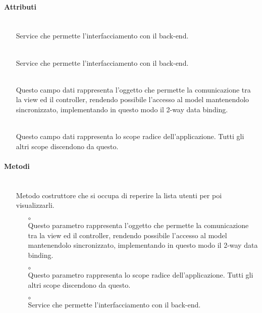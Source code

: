 \paragraph*{Attributi}
\begin{itemize}
\item[]  \\ Service che permette l'interfacciamento con il back-end.
\item[]  \\ Service che permette l'interfacciamento con il back-end.
\item[]  \\ Questo campo dati rappresenta l'oggetto che permette la comunicazione tra la view ed il controller, rendendo possibile l’accesso al model mantenendolo sincronizzato, implementando in questo modo il 2-way data binding.
\item[]  \\ Questo campo dati rappresenta lo scope radice dell'applicazione. Tutti gli altri scope discendono da questo.
\end{itemize}

\paragraph*{Metodi}
\begin{itemize}
\item[]  \\ Metodo costruttore che si occupa di reperire la lista utenti per poi visualizzarli.
\begin{itemize}\addtolength{\itemsep}{-0.5\baselineskip}
\item[$\circ$]  \\ Questo parametro rappresenta l'oggetto che permette la comunicazione tra la view ed il controller, rendendo possibile l’accesso al model mantenendolo sincronizzato, implementando in questo modo il 2-way data binding.
\item[$\circ$]  \\ Questo parametro rappresenta lo scope radice dell'applicazione. Tutti gli altri scope discendono da questo.
\item[$\circ$]  \\ Service che permette l'interfacciamento con il back-end.
\end{itemize}
\end{itemize}


